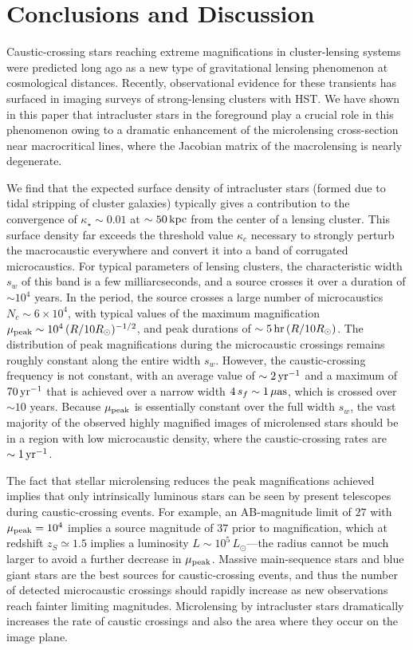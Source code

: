 \documentclass{aastex6}
\begin{document}
\section{Conclusions and Discussion}
\label{sec:concl}

Caustic-crossing stars reaching extreme magnifications in cluster-lensing systems were predicted long ago as a new type of gravitational lensing phenomenon at cosmological distances. Recently, observational evidence for these transients has surfaced in imaging surveys of strong-lensing
clusters with HST. We have shown in this paper that intracluster stars in the foreground play a crucial role in this phenomenon owing to a dramatic enhancement of the microlensing cross-section near macrocritical lines, where the Jacobian matrix of the macrolensing is nearly degenerate.

We find that the expected surface density of intracluster stars (formed due to tidal stripping of cluster galaxies) typically gives a contribution to the convergence of $\kappa_\star \sim 0.01$ at $\sim 50\,{\rm kpc}$ from the center of a lensing cluster. This surface density far exceeds the threshold value $\kappa_c$ necessary to strongly perturb the macrocaustic everywhere and convert it into a band of corrugated microcaustics. For typical parameters of lensing clusters, the characteristic width $s_w$ of this band is a few milliarcseconds, and a source crosses it over a duration of $\sim 10^4$ years. In the period, the source crosses a large number of microcaustics $N_c \sim 6 \times 10^4$, with typical
values of the maximum magnification $\mu_{\rm peak}\sim 10^4\, (R/10 R_\odot)^{-1/2}$, and peak durations of $\sim 5\, {\rm hr}\, (R/10 R_\odot)$. The distribution of peak magnifications during the microcaustic crossings remains roughly constant along the entire width $s_w$. However, the caustic-crossing frequency is not constant, with an average value of $\sim 2\, {\rm yr}^{-1}$ and a maximum of $70\, {\rm yr}^{-1}$ that is achieved over a narrow width $4\,s_f \sim 1\, \mu{\rm as}$, which is crossed over $\sim 10$ years. Because $\mu_{\rm peak}$ is essentially constant over the full width $s_w$, the vast majority of the observed highly magnified images of microlensed stars should be in a region with low microcaustic density, where the caustic-crossing rates are $\sim 1\, {\rm yr}^{-1}$.

The fact that stellar microlensing reduces the peak magnifications achieved implies that only intrinsically luminous stars can be seen by present telescopes during caustic-crossing events. For example, an AB-magnitude limit of $27$ with $\mu_{\rm peak} = 10^4$ implies a source magnitude of $37$ prior to magnification, which at redshift $z_S \simeq 1.5$ implies a luminosity $L\sim 10^5\, L_{\odot}$---the radius cannot be much larger to avoid a further decrease in $\mu_{\rm peak}$. Massive main-sequence stars and blue giant stars are the best sources for caustic-crossing events, and thus the number of detected microcaustic crossings should rapidly increase as new observations reach fainter limiting magnitudes. Microlensing by intracluster stars dramatically increases the rate of caustic crossings and also the area where they occur on the image plane.
\end{document}
